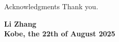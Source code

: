\begin{abstractpage}{Acknowledgments}
Thank you.

\par\bigskip
\par\bigskip

\begin{flushright}
\par\bigskip
\textbf{Li Zhang}\\
\textbf{Kobe, the 22th of August 2025}
\end{flushright}
\end{abstractpage}
